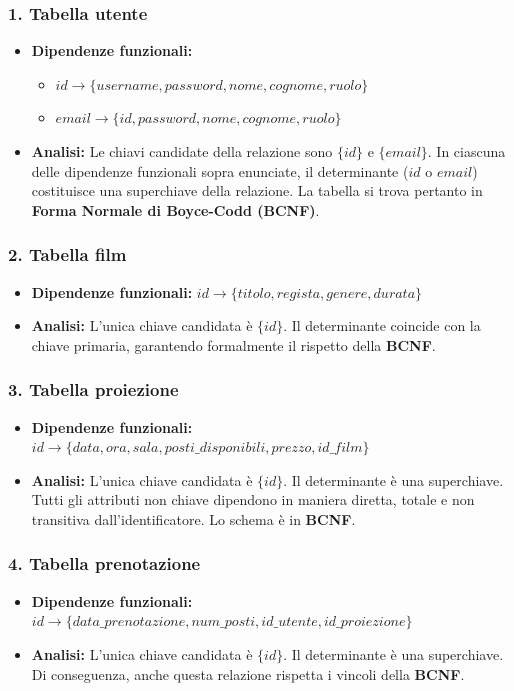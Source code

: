 \documentclass{article}
\begin{document}
\subsubsection{1. Tabella utente}
\begin{itemize}
    \item \textbf{Dipendenze funzionali:}
    \begin{itemize}
        \item $id \rightarrow \{username, password, nome, cognome, ruolo\}$
        \item $email \rightarrow \{id, password, nome, cognome, ruolo\}$
    \end{itemize}
    \item \textbf{Analisi:} Le chiavi candidate della relazione sono $\{id\}$ e $\{email\}$. In ciascuna delle dipendenze funzionali sopra enunciate, il determinante ($id$ o $email$) costituisce una superchiave della relazione. La tabella si trova pertanto in \textbf{Forma Normale di Boyce-Codd (BCNF)}.
\end{itemize}
\subsubsection{2. Tabella film}
\begin{itemize}
    \item \textbf{Dipendenze funzionali:} $id \rightarrow \{titolo, regista, genere, durata\}$
    \item \textbf{Analisi:} L'unica chiave candidata è $\{id\}$. Il determinante coincide con la chiave primaria, garantendo formalmente il rispetto della \textbf{BCNF}.
\end{itemize}

\subsubsection{3. Tabella proiezione}
\begin{itemize}
    \item \textbf{Dipendenze funzionali:} $id \rightarrow \{data, ora, sala, posti\_disponibili, prezzo, id\_film\}$
    \item \textbf{Analisi:} L'unica chiave candidata è $\{id\}$. Il determinante è una superchiave. Tutti gli attributi non chiave dipendono in maniera diretta, totale e non transitiva dall'identificatore. Lo schema è in \textbf{BCNF}.
\end{itemize}
\subsubsection{4. Tabella prenotazione}
\begin{itemize}
    \item \textbf{Dipendenze funzionali:} $id \rightarrow \{data\_prenotazione, num\_posti, id\_utente, id\_proiezione\}$
    \item \textbf{Analisi:} L'unica chiave candidata è $\{id\}$. Il determinante è una superchiave. Di conseguenza, anche questa relazione rispetta i vincoli della \textbf{BCNF}.
\end{itemize}
\end{document}
